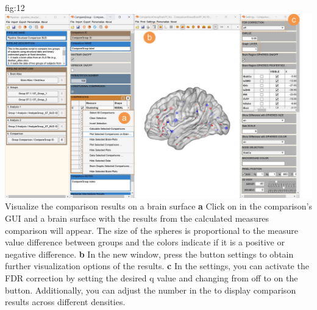 \documentclass[justified]{tufte-handout}
\begin{document}
	{fig:12}
	{
	\includegraphics{fig12.jpg}
	}
    {Visualize the comparison results on a brain surface}
    {
        {\bf a} Click on  in the comparison's GUI and a brain surface with the results from the calculated measures comparison will appear. The size of the spheres is proportional to the measure value difference between groups and the colors indicate if it is a positive or negative difference.   
        {\bf b} In the new window, press the button settings to obtain further visualization options of the results. 
        {\bf c} In the settings, you can activate the FDR correction by setting the desired q value and changing from off to on the button. Additionally, you can adjust the number in the  to display comparison results across different densities.
    }
\end{document}
